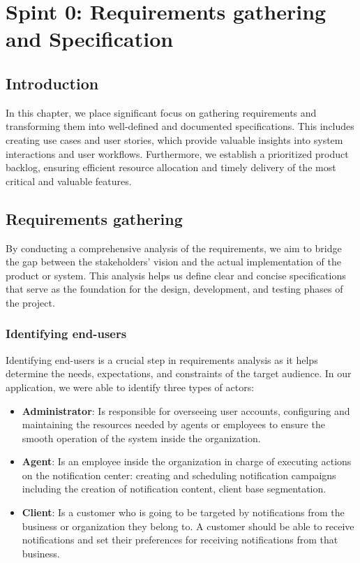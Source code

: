 \chapter{Spint 0: Requirements gathering and Specification}

\section*{Introduction}
In this chapter, we place significant focus on gathering requirements and transforming them 
into well-defined and documented specifications. This includes creating use cases and user stories, 
which provide valuable insights into system interactions and user workflows. Furthermore, we establish 
a prioritized product backlog, ensuring efficient resource allocation and timely delivery of the most 
critical and valuable features. 

\section{Requirements gathering}
By conducting a comprehensive analysis of the requirements, we aim to bridge the gap between 
the stakeholders' vision and the actual implementation of the product or system. 
This analysis helps us define clear and concise specifications that serve as the foundation for the design, 
development, and testing phases of the project.

\subsection{Identifying end-users}
Identifying end-users is a crucial step in requirements analysis as it helps determine the needs, 
expectations, and constraints of the target audience. In our application, we were able to identify 
three types of actors:

\begin{itemize}
    \item \textbf{Administrator}: Is responsible for overseeing user accounts, configuring and maintaining the 
    resources needed by agents or employees to ensure the smooth operation of the system inside the organization.
    
    \item \textbf{Agent}: Is an employee inside the organization in charge of executing actions on the 
    notification center: creating and scheduling notification campaigns including the creation of
    notification content, client base segmentation. 

    \item \textbf{Client}: Is a customer who is going to be targeted by notifications from the business 
    or organization they belong to. A customer should be able to receive notifications and set their 
    preferences for receiving notifications from that business. 
\end{itemize}

